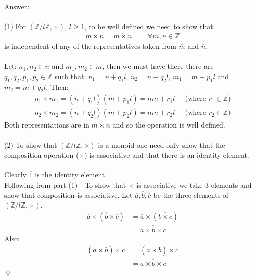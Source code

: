 \documentclass[12pt,a4paper]{article}
\begin{document}
\vspace{1cm}
\noindent
Answer:\\
\\
(1) For $(\mathbb{Z} / l\mathbb{Z}, \times)$, $l \ge 1$, to be well defined we need to show that:
\begin{align*}
  \overline{m} \times \overline{n} = \overline{m \times n} \;\;\;\;\;\;\;\; \forall m,n \in \mathbb{Z}
\end{align*}
is independent of any of the representatives taken from $\overline{m}$ and $\overline{n}$.\\
\\
Let: $n_1, n_2 \in \overline{n}$ and $m_1, m_2 \in \overline{m}$, then we must have there there
are $q_1, q_2, p_1, p_2 \in \mathbb{Z}$ such that: $n_1 = n + q_1 l$, $n_2 = n + q_2 l$, $m_1 = m + p_1 l$ and $m_2 = m + q_2 l$.  Then:
\begin{align*}
  n_1 \times m_1 = (n + q_1 l)(m + p_1 l) = n m + r_1 l \;\;\;\;\; \text{(where $r_1 \in \mathbb{Z}$)} \tag{1.1} \\
  n_2 \times m_2 = (n + q_2 l)(m + p_2 l) = n m + r_2 l \;\;\;\;\; \text{(where $r_2 \in \mathbb{Z}$)} \tag{1.2}
\end{align*}
Both representations are in $\overline{m \times n}$ and so the operation is well defined.\\
\\
(2) To show that $(\mathbb{Z} / l\mathbb{Z}, \times)$ is a monoid one need only show that the composition operation ($\times$) is associative and that
there is an identity element.\\
\\
Clearly $\overline{1}$ is the identity element.\\
Following from part (1) - To show that $\times$ is associative we take 3 elements and show that composition is associative.
Let $\overline{a}, \overline{b}, \overline{c}$ be the three elements of $(\mathbb{Z} / l\mathbb{Z}, \times)$.
\begin{align*}
  \overline{a} \times (\overline{b} \times \overline{c}) &= \overline{a} \times (\overline{b \times c}) \\
  &= \overline{a \times b \times c }
\end{align*}
Also:
\begin{align*}
  (\overline{a} \times \overline{b}) \times \overline{c} &= (\overline{a \times b}) \times \overline{c} \\
  &= \overline{a \times b \times c }
\end{align*}
\qed\\
\end{document}
